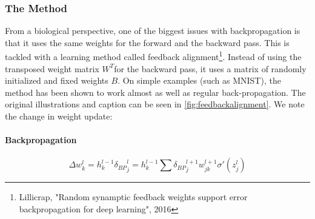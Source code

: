 \documentclass[main]{subfiles}
\begin{document}
\subsubsection{The Method}
From a biological perspective, one of the biggest issues with backpropagation is that it uses the same weights for the forward and the backward pass. This is tackled with a learning method called feedback alignment\footnote{Lillicrap, "Random synamptic feedback weights support error backpropagation for deep learning", 2016}. Instead of using the transposed weight matrix $W^T$for the backward pass, it uses a matrix of randomly initialized and fixed weights $B$. On simple examples (such as MNIST), the method has been shown to work almost as well as regular back-propagation. The original illustrations and caption can be seen in \cref{fig:feedbackalignment}. We note the change in weight update:
\paragraph{Backpropagation}
\begin{equation}
    \Delta w_k^l = h_k^{l-1} {\delta_{BP}}_j^l = h_k^{l-1} \sum {\delta_{BP}}_j^{l+1} w_{j k}^{l+1} \sigma'(z_j^l)
\end{equation}
\end{document}
